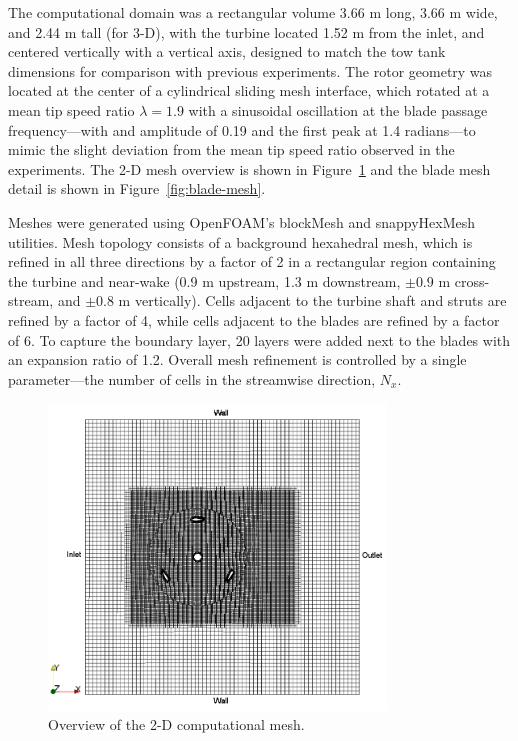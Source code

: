 \documentclass[aip,graphicx]{revtex4-1}
\begin{document}
The computational domain was a rectangular volume 3.66 m long, 3.66 m wide, and
2.44 m tall (for 3-D), with the turbine located 1.52 m from the inlet, and
centered vertically with a vertical axis, designed to match the tow tank
dimensions for comparison with previous experiments. The rotor geometry was
located at the center of a cylindrical sliding mesh interface, which rotated at
a mean tip speed ratio $\lambda=1.9$ with a sinusoidal oscillation at the blade
passage frequency---with and amplitude of 0.19 and the first peak at 1.4
radians---to mimic the slight deviation from the mean tip speed ratio observed
in the experiments. The 2-D mesh overview is shown in
Figure~\ref{fig:2d-br-mesh} and the blade mesh detail is shown in
Figure~\ref{fig:blade-mesh}.

Meshes were generated using OpenFOAM's blockMesh and snappyHexMesh utilities.
Mesh topology consists of a background hexahedral mesh, which is refined in all
three directions by a factor of 2 in a rectangular region containing the turbine
and near-wake (0.9 m upstream, 1.3 m downstream, $\pm 0.9$ m cross-stream, and
$\pm 0.8$ m vertically). Cells adjacent to the turbine shaft and struts are
refined by a factor of 4, while cells adjacent to the blades are refined by a
factor of 6. To capture the boundary layer, 20 layers were added next to the
blades with an expansion ratio of 1.2. Overall mesh refinement is controlled by
a single parameter---the number of cells in the streamwise direction, $N_x$.

\begin{figure}
    \centering

    \includegraphics[width=0.8\textwidth]{2D_mesh}

    \caption{Overview of the 2-D computational mesh.}

    \label{fig:2d-br-mesh}
\end{figure}
\end{document}
